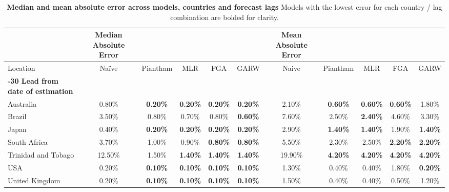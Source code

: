 \begin{table}[!ht]
    \centering
    \caption[\textbf{Median and mean absolute error across models, countries and forecast lags}]{
	\textbf{Median and mean absolute error across models, countries and forecast lags}
	Models with the lowest error for each country / lag combination are bolded for clarity.
	}
		\label{table:Table1}
    \begin{adjustbox}{max width=\textwidth} %
    \begin{tabular}{|l|c|c|c|c|c|c|c|c|c|c|}
    \hline
        ~ &  \textbf{Median Absolute Error} & ~ & ~ & ~ & ~ & \textbf{Mean Absolute Error} & ~ & ~ & ~ \\ \hline
        Location & Naïve & Piantham & MLR & FGA & GARW & Naive & Piantham & MLR & FGA & GARW \\ \hline
        \textbf{-30 Lead from date of estimation} & ~ & ~ & ~ & ~ & ~ & ~ & ~ & ~ & ~ & ~ \\ \hline
		Australia & 0.80\% & \textbf{0.20\%} & \textbf{0.20\%} & \textbf{0.20\%} & \textbf{0.20\%} & 2.10\% & \textbf{0.60\%} & \textbf{0.60\%} & \textbf{0.60\%} & 1.80\% \\ \hline
        Brazil    & 3.50\% & 0.80\% & 0.70\% & 0.80\% & \textbf{0.60\%} & 7.60\% & 2.50\% & \textbf{2.40\%} & 4.60\% & 3.30\% \\ \hline
        Japan     & 0.40\% & \textbf{0.20\%} & \textbf{0.20\%} & \textbf{0.20\%} & \textbf{0.20\%} & 2.90\% & \textbf{1.40\%} & \textbf{1.40\%} & 1.90\% & \textbf{1.40\%} \\ \hline
        South Africa & 3.70\% & 1.00\% & 0.90\% & \textbf{0.80\%} & \textbf{0.80\%} & 5.50\% & 2.30\% & 2.50\% & \textbf{2.20\%} & \textbf{2.20\%} \\ \hline
        Trinidad and Tobago & 12.50\% & 1.50\% & \textbf{1.40\%} & \textbf{1.40\%} & \textbf{1.40\%} & 19.90\% & \textbf{4.20\%} & \textbf{4.20\%} & \textbf{4.20\%} & \textbf{4.20\%} \\ \hline
        USA & 0.20\% & \textbf{0.10\%} & \textbf{0.10\%} & \textbf{0.10\%} & \textbf{0.10\%} & 1.30\% & 0.40\% & 0.40\% & 1.80\% & \textbf{0.20\%} \\ \hline
        United Kingdom & 0.20\% & \textbf{0.10\%} & \textbf{0.10\%} & \textbf{0.10\%} & \textbf{0.10\%} & 1.50\% & 0.40\% & 0.40\% & 0.50\% & 1.20\% \\ \hline

\end{tabular}
\end{adjustbox}
\end{table}
